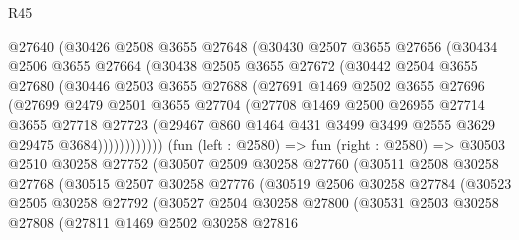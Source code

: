 \begin{lexlean}{R45}
\begin{coremodule}
            @27640
            (@30426
              @2508
              @3655
              @27648
              (@30430
                @2507
                @3655
                @27656
                (@30434
                  @2506
                  @3655
                  @27664
                  (@30438
                    @2505
                    @3655
                    @27672
                    (@30442
                      @2504
                      @3655
                      @27680
                      (@30446
                        @2503
                        @3655
                        @27688
                        (@27691
                          @1469
                          @2502
                          @3655
                          @27696
                          (@27699
                            @2479
                            @2501
                            @3655
                            @27704
                            (@27708
                              @1469
                              @2500
                              @26955
                              @27714
                              @3655
                              @27718
                              @27723
                              (@29467
                                @860
                                @1464
                                @431
                                @3499
                                @3499
                                @2555
                                @3629
                                @29475
                                @3684))))))))))))
        (fun (left : @2580) =>
        fun (right : @2580) =>
        @30503
          @2510
          @30258
          @27752
          (@30507
            @2509
            @30258
            @27760
            (@30511
              @2508
              @30258
              @27768
              (@30515
                @2507
                @30258
                @27776
                (@30519
                  @2506
                  @30258
                  @27784
                  (@30523
                    @2505
                    @30258
                    @27792
                    (@30527
                      @2504
                      @30258
                      @27800
                      (@30531
                        @2503
                        @30258
                        @27808
                        (@27811
                          @1469
                          @2502
                          @30258
                          @27816

\end{coremodule}
\end{lexlean}
